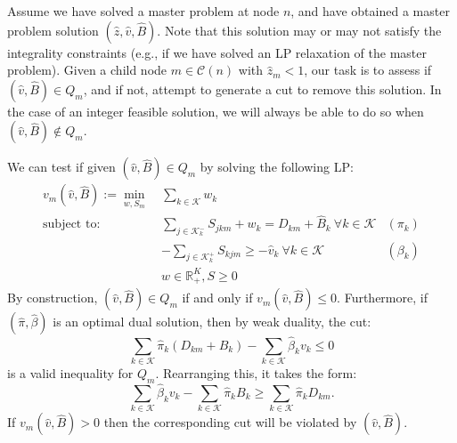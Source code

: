 \documentclass[10pt]{article}
\newcommand{\ka}{k} %
\newcommand{\KA}{\mathcal{K}}
\newcommand{\Ka}{K}
\newcommand{\jey}{j} %
\newcommand{\Bi}{B} %
\newcommand{\Vi}{v} %
\newcommand{\Es}{S} %
\newcommand{\Zed}{z} %
\newcommand{\cn}{\mathcal{C}(n) }
\newcommand{\Csub}{\mathcal{K}^+_k}
\newcommand{\Psub}{\mathcal{K}^-_k}
\begin{document}
\newcommand{\vsol}{\hat{\Vi}}
\newcommand{\zsol}{\hat{\Zed}}
\newcommand{\bsol}{\hat{\Bi}}
\newcommand{\pisol}{\hat{\pi}}
\newcommand{\betasol}{\hat{\beta}}

Assume we have solved a master problem at node $n$, and have obtained a master problem solution $(\zsol,\vsol,\bsol)$. Note that this solution may or may not satisfy the integrality constraints (e.g., if we have solved an LP relaxation of the master problem). Given a child node $m \in \cn$ with $\zsol_m < 1$, our task is to assess if $(\vsol,\bsol) \in Q_m$, and if not, attempt to generate a cut to remove this solution. In the case of an integer feasible solution, we will always be able to do so when $(\vsol,\bsol) \notin Q_m$.

We can test if given $(\vsol,\bsol) \in Q_m$ by solving the following LP:
\begin{align*}
\Vi_m(\vsol,\bsol) :=  \min_{w,\Es_m} \ & \sum_{\ka  \in \KA} w_k \\
    \text{subject to: } & \sum_{\jey \in  \Psub} \Es_{\jey \ka m} + w_k = D_{km} + \bsol_k \ \forall \ka  \in \KA & (\pi_k) \\
    &-\sum_{\jey \in  \Csub} \Es_{\ka \jey m} \geq -\vsol_k \ \forall \ka  \in \KA& (\beta_k) \\
    & w \in \mathbb{R}_+^{\Ka}, S \geq 0
\end{align*}
By construction, $(\vsol,\bsol) \in Q_m$ if and only if $\Vi_m(\vsol,\bsol) \leq 0$. Furthermore, if $(\pisol,\betasol)$ is an optimal dual solution, then by weak duality, the cut:
 \[ \sum_{\ka  \in \KA} \pisol_k (D_{km} + \Bi_k) - \sum_{\ka  \in \KA} \betasol_k \Vi_k \leq 0 \]
is a valid inequality for $Q_m$. Rearranging this, it takes the form:
\[ \sum_{\ka  \in \KA} \betasol_k \Vi_k - \sum_{\ka  \in \KA} \pisol_k \Bi_k  \geq  \sum_{\ka  \in \KA} \pisol_k D_{km}. \]
If $\Vi_m(\vsol,\bsol) > 0$ then the corresponding cut will be violated by $(\vsol,\bsol)$. 
\end{document}
